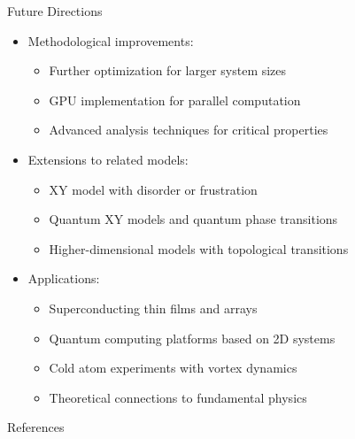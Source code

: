 \documentclass[11pt,aspectratio=169]{beamer}
\begin{document}
\begin{frame}{Future Directions}
    \begin{itemize}
        \item Methodological improvements:
        \begin{itemize}
            \item Further optimization for larger system sizes
            \item GPU implementation for parallel computation
            \item Advanced analysis techniques for critical properties
        \end{itemize}
        \pause
        \item Extensions to related models:
        \begin{itemize}
            \item XY model with disorder or frustration
            \item Quantum XY models and quantum phase transitions
            \item Higher-dimensional models with topological transitions
        \end{itemize}
        \pause
        \item Applications:
        \begin{itemize}
            \item Superconducting thin films and arrays
            \item Quantum computing platforms based on 2D systems
            \item Cold atom experiments with vortex dynamics
            \item Theoretical connections to fundamental physics
        \end{itemize}
    \end{itemize}
\end{frame}

\begin{frame}[allowframebreaks]{References}
    \printbibliography
\end{frame}
\end{document}
